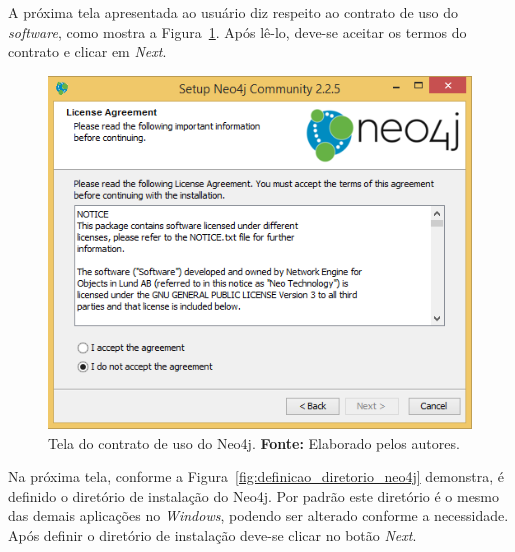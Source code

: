 \par A próxima tela apresentada ao usuário diz respeito ao contrato de uso do \textit{software}, como mostra a Figura~\ref{fig:contrato_neo4j}. Após lê-lo, deve-se aceitar os termos do contrato e clicar em \textit{Next}.

\newpage
\begin{figure}[h!]
	\centerline{\includegraphics[scale=0.4]{./imagens/neo4j-install-step2.png}}
	\caption[Tela do contrato de uso do Neo4j]
	{Tela do contrato de uso do Neo4j. \textbf{Fonte:} Elaborado pelos autores.}
	\label{fig:contrato_neo4j}
\end{figure}

\par Na próxima tela, conforme a Figura~\ref{fig:definicao_diretorio_neo4j} demonstra, é definido o diretório de instalação do Neo4j. Por padrão este diretório é o mesmo das demais aplicações no \textit{Windows}, podendo ser alterado conforme a necessidade. Após definir o diretório de instalação deve-se clicar no botão \textit{Next}.

